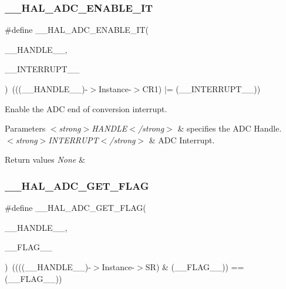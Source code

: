 \subsubsection{\texorpdfstring{\_\_HAL\_ADC\_ENABLE\_IT}{\_\_HAL\_ADC\_ENABLE\_IT}}
{\footnotesize\ttfamily \#define \+\_\+\+\_\+\+H\+A\+L\+\_\+\+A\+D\+C\+\_\+\+E\+N\+A\+B\+L\+E\+\_\+\+IT(\begin{DoxyParamCaption}\item[{}]{\+\_\+\+\_\+\+H\+A\+N\+D\+L\+E\+\_\+\+\_\+,  }\item[{}]{\+\_\+\+\_\+\+I\+N\+T\+E\+R\+R\+U\+P\+T\+\_\+\+\_\+ }\end{DoxyParamCaption})~(((\+\_\+\+\_\+\+H\+A\+N\+D\+L\+E\+\_\+\+\_\+)-\/$>$Instance-\/$>$C\+R1) $\vert$= (\+\_\+\+\_\+\+I\+N\+T\+E\+R\+R\+U\+P\+T\+\_\+\+\_\+))}



Enable the A\+DC end of conversion interrupt. 


\begin{DoxyParams}{Parameters}
{\em $<$strong$>$\+H\+A\+N\+D\+L\+E$<$/strong$>$} & specifies the A\+DC Handle. \\
\hline
{\em $<$strong$>$\+I\+N\+T\+E\+R\+R\+U\+P\+T$<$/strong$>$} & A\+DC Interrupt. \\
\hline
\end{DoxyParams}

\begin{DoxyRetVals}{Return values}
{\em None} & \\
\hline
\end{DoxyRetVals}
\mbox{\label{group___a_d_c___exported___macros_gaff951862689bb92173f803577cf2d447}} 
\subsubsection{\texorpdfstring{\_\_HAL\_ADC\_GET\_FLAG}{\_\_HAL\_ADC\_GET\_FLAG}}
{\footnotesize\ttfamily \#define \+\_\+\+\_\+\+H\+A\+L\+\_\+\+A\+D\+C\+\_\+\+G\+E\+T\+\_\+\+F\+L\+AG(\begin{DoxyParamCaption}\item[{}]{\+\_\+\+\_\+\+H\+A\+N\+D\+L\+E\+\_\+\+\_\+,  }\item[{}]{\+\_\+\+\_\+\+F\+L\+A\+G\+\_\+\+\_\+ }\end{DoxyParamCaption})~((((\+\_\+\+\_\+\+H\+A\+N\+D\+L\+E\+\_\+\+\_\+)-\/$>$Instance-\/$>$SR) \& (\+\_\+\+\_\+\+F\+L\+A\+G\+\_\+\+\_\+)) == (\+\_\+\+\_\+\+F\+L\+A\+G\+\_\+\+\_\+))}



